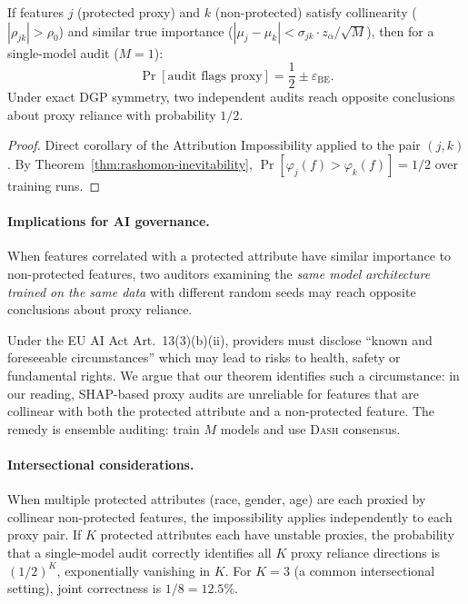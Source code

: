 \documentclass{jmlr}
\newcommand{\DASH}{\textsc{Dash}}
\begin{document}
\begin{theorem}
\label{thm:fairness-audit}
If features $j$ (protected proxy) and $k$ (non-protected) satisfy collinearity ($|\rho_{jk}| > \rho_0$) and similar true importance ($|\mu_j - \mu_k| < \sigma_{jk} \cdot z_\alpha / \sqrt{M}$), then for a single-model audit ($M{=}1$):
\[
    \Pr[\text{audit flags proxy}] = \frac{1}{2} \pm \varepsilon_{\text{BE}}.
\]
Under exact DGP symmetry, two independent audits reach opposite conclusions about proxy reliance with probability $1/2$.
\end{theorem}

\begin{proof}
Direct corollary of the Attribution Impossibility applied to the pair $(j, k)$. By Theorem~\ref{thm:rashomon-inevitability}, $\Pr[\varphi_j(f) > \varphi_k(f)] = 1/2$ over training runs.
\end{proof}

\paragraph{Implications for AI governance.}
When features correlated with a protected attribute have similar importance to non-protected features, two auditors examining the \emph{same model architecture trained on the same data} with different random seeds may reach opposite conclusions about proxy reliance.

Under the EU AI Act Art.~13(3)(b)(ii), providers must disclose ``known and foreseeable circumstances'' which may lead to risks to health, safety or fundamental rights. We argue that our theorem identifies such a circumstance: in our reading, SHAP-based proxy audits are unreliable for features that are collinear with both the protected attribute and a non-protected feature. The remedy is ensemble auditing: train $M$ models and use \DASH{} consensus.

\paragraph{Intersectional considerations.}
When multiple protected attributes (race, gender, age) are each proxied by collinear non-protected features, the impossibility applies independently to each proxy pair. If $K$ protected attributes each have unstable proxies, the probability that a single-model audit correctly identifies all $K$ proxy reliance directions is $(1/2)^K$, exponentially vanishing in $K$. For $K = 3$ (a common intersectional setting), joint correctness is $1/8 = 12.5\%$.
\end{document}
